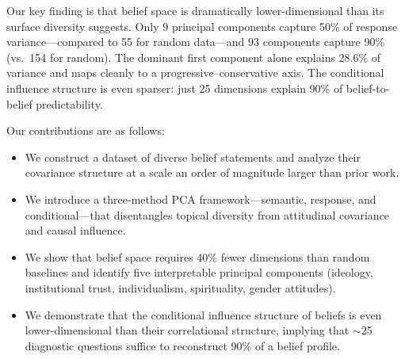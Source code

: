 Our key finding is that belief space is dramatically lower-dimensional than its surface diversity suggests. Only 9 principal components capture 50\% of response variance---compared to 55 for random data---and 93 components capture 90\% (vs.\ 154 for random). The dominant first component alone explains 28.6\% of variance and maps cleanly to a progressive--conservative axis. The conditional influence structure is even sparser: just 25 dimensions explain 90\% of belief-to-belief predictability.

Our contributions are as follows:
\begin{itemize}[leftmargin=*,itemsep=0pt,topsep=0pt]
    \item We construct a dataset of \nbeliefs diverse belief statements and analyze their covariance structure at a scale an order of magnitude larger than prior work.
    \item We introduce a three-method PCA framework---semantic, response, and conditional---that disentangles topical diversity from attitudinal covariance and causal influence.
    \item We show that belief space requires 40\% fewer dimensions than random baselines and identify five interpretable principal components (ideology, institutional trust, individualism, spirituality, gender attitudes).
    \item We demonstrate that the conditional influence structure of beliefs is even lower-dimensional than their correlational structure, implying that $\sim$25 diagnostic questions suffice to reconstruct 90\% of a belief profile.
\end{itemize}
